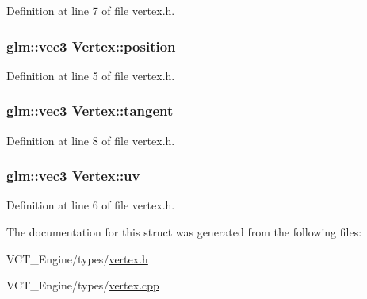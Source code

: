Definition at line 7 of file vertex.\+h.

\hypertarget{struct_vertex_a030819fdc241743bbd3e180a6b132ed3}{}
\subsubsection[{position}]{\setlength{\rightskip}{0pt plus 5cm}glm\+::vec3 Vertex\+::position}\label{struct_vertex_a030819fdc241743bbd3e180a6b132ed3}


Definition at line 5 of file vertex.\+h.

\hypertarget{struct_vertex_a89587fd853d4f3f42900715620a7364d}{}
\subsubsection[{tangent}]{\setlength{\rightskip}{0pt plus 5cm}glm\+::vec3 Vertex\+::tangent}\label{struct_vertex_a89587fd853d4f3f42900715620a7364d}


Definition at line 8 of file vertex.\+h.

\hypertarget{struct_vertex_a825ca69622b52af1624641fbe6ecc718}{}
\subsubsection[{uv}]{\setlength{\rightskip}{0pt plus 5cm}glm\+::vec3 Vertex\+::uv}\label{struct_vertex_a825ca69622b52af1624641fbe6ecc718}


Definition at line 6 of file vertex.\+h.



The documentation for this struct was generated from the following files\+:\begin{DoxyCompactItemize}
\item 
V\+C\+T\+\_\+\+Engine/types/\hyperlink{vertex_8h}{vertex.\+h}\item 
V\+C\+T\+\_\+\+Engine/types/\hyperlink{vertex_8cpp}{vertex.\+cpp}\end{DoxyCompactItemize}

